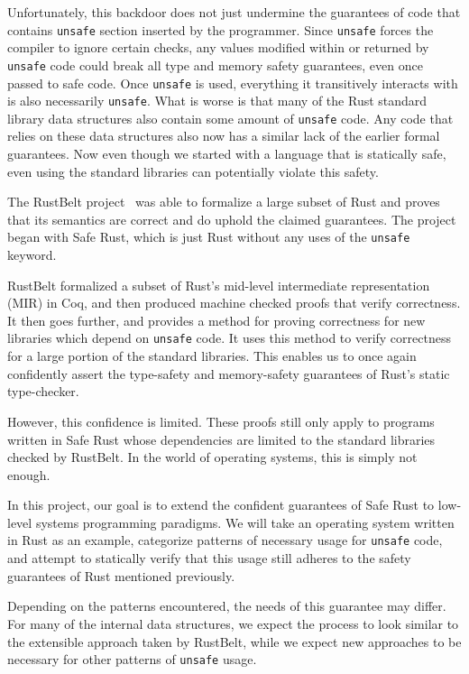 \documentclass[12pt]{article}
\begin{document}
Unfortunately, this backdoor does not just undermine the guarantees of code that contains \texttt{unsafe} section inserted by the programmer. Since \texttt{unsafe} forces the compiler to ignore certain checks, any values modified within or returned by \texttt{unsafe} code could break all type and memory safety guarantees, even once passed to safe code. Once \texttt{unsafe} is used, everything it transitively interacts with is also necessarily \texttt{unsafe}. What is worse is that many of the Rust standard library data structures also contain some amount of \texttt{unsafe} code. Any code that relies on these data structures also now has a similar lack of the earlier formal guarantees. Now even though we started with a language that is statically safe, even using the standard libraries can potentially violate this safety.

The RustBelt project~\cite{jung2017rustbelt} was able to formalize a large subset of Rust and proves that its semantics are correct and do uphold the claimed guarantees. The project began with Safe Rust, which is just Rust without any uses of the \texttt{unsafe} keyword. 

RustBelt formalized a subset of Rust's mid-level intermediate representation (MIR) in Coq, and then produced machine checked proofs that verify correctness. It then goes further, and provides a method for proving correctness for new libraries which depend on \texttt{unsafe} code. It uses this method to verify correctness for a large portion of the standard libraries. This enables us to once again confidently assert the type-safety and memory-safety guarantees of Rust's static type-checker.

However, this confidence is limited. These proofs still only apply to programs written in Safe Rust whose dependencies are limited to the standard libraries checked by RustBelt. In the world of operating systems, this is simply not enough. %

In this project, our goal is to extend the confident guarantees of Safe Rust to low-level systems programming paradigms. We will take an operating system written in Rust as an example, categorize patterns of necessary usage for \texttt{unsafe} code, and attempt to statically verify that this usage still adheres to the safety guarantees of Rust mentioned previously. 

Depending on the patterns encountered, the needs of this guarantee may differ. For many of the internal data structures, we expect the process to look similar to the extensible approach taken by RustBelt, while we expect new approaches to be necessary for other patterns of \texttt{unsafe} usage.
\end{document}
